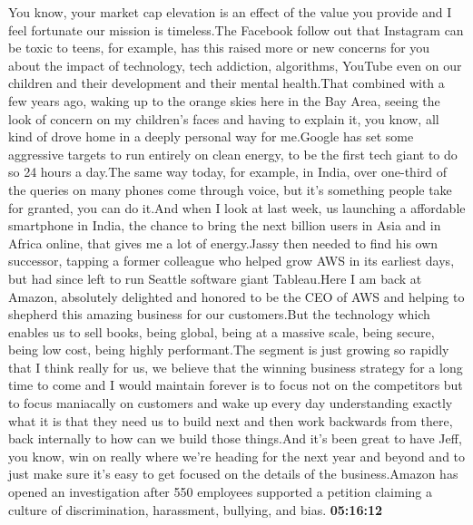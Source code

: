 \documentclass{article}%
\begin{document}
You know, your market cap elevation is an effect of the value you provide and I feel fortunate our mission is timeless.The Facebook follow out that Instagram can be toxic to teens, for example, has this raised more or new concerns for you about the impact of technology, tech addiction, algorithms, YouTube even on our children and their development and their mental health.That combined with a few years ago, waking up to the orange skies here in the Bay Area, seeing the look of concern on my children's faces and having to explain it, you know, all kind of drove home in a deeply personal way for me.Google has set some aggressive targets to run entirely on clean energy, to be the first tech giant to do so 24 hours a day.The same way today, for example, in India, over one{-}third of the queries on many phones come through voice, but it's something people take for granted, you can do it.And when I look at last week, us launching a affordable smartphone in India, the chance to bring the next billion users in Asia and in Africa online, that gives me a lot of energy.Jassy then needed to find his own successor, tapping a former colleague who helped grow AWS in its earliest days, but had since left to run Seattle software giant Tableau.Here I am back at Amazon, absolutely delighted and honored to be the CEO of AWS and helping to shepherd this amazing business for our customers.But the technology which enables us to sell books, being global, being at a massive scale, being secure, being low cost, being highly performant.The segment is just growing so rapidly that I think really for us, we believe that the winning business strategy for a long time to come and I would maintain forever is to focus not on the competitors but to focus maniacally on customers and wake up every day understanding exactly what it is that they need us to build next and then work backwards from there, back internally to how can we build those things.And it's been great to have Jeff, you know, win on really where we're heading for the next year and beyond and to just make sure it's easy to get focused on the details of the business.Amazon has opened an investigation after 550 employees supported a petition claiming a culture of discrimination, harassment, bullying, and bias.%
\textbf{05:16:12}%
\newline%
\end{document}

